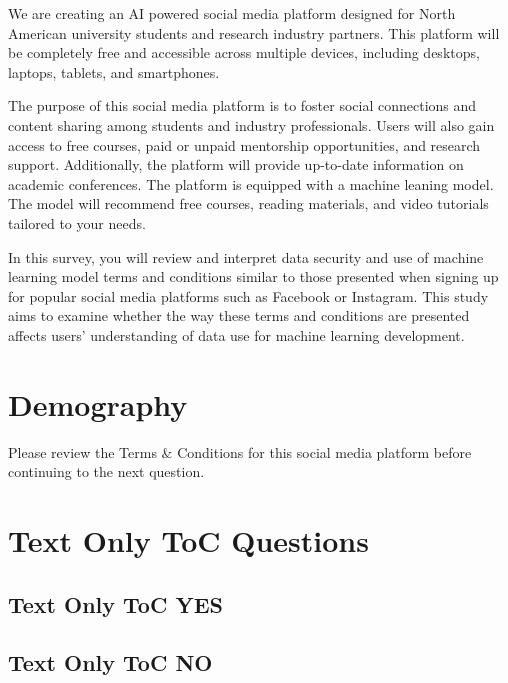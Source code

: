 \documentclass[a4paper,12pt,doube]{scrartcl}
\begin{document}
	
	We are creating an AI powered social media platform designed for North American university students and research industry partners. This platform will be completely free and accessible across multiple devices, including desktops, laptops, tablets, and smartphones. 
	
	The purpose of this social media platform is to foster social connections and content sharing among students and industry professionals. Users will also gain access to free courses, paid or unpaid mentorship opportunities, and research support. Additionally, the platform will provide up-to-date information on academic conferences. The platform is equipped with a machine leaning model. The model will recommend free courses, reading materials, and video tutorials tailored to your needs. 
	
	In this survey, you will review and interpret data security and use of machine learning model terms and conditions similar to those presented when signing up for popular social media platforms such as Facebook or Instagram. This study aims to examine whether the way these terms and conditions are presented affects users’ understanding of data use for machine learning development.
	\section{Demography}
	
		
	
	Please review the Terms \& Conditions for this social media platform before continuing to the next question.
	
	\begin{singlespace}
		\begin{framed}
			
		\end{framed}
	\end{singlespace}
	
	\section{Text Only ToC Questions}
	
		
	
	\subsection{Text Only ToC YES}
	
		
	
	\subsection{Text Only ToC NO}
	
\end{document}
